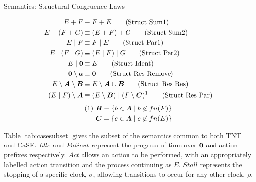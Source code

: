 \documentclass[orivec]{llncs}
\begin{document}
\begin{table}
  \caption{Semantics: Structural Congruence Laws}
 \label{tab:structcong}
 \vspace{-3mm}
  \shrule
  \begin{align}
   E + F & \equiv F + E \tag{Struct Sum1} \label{structsum1}
  \\
   E + (F + G) & \equiv (E + F) + G \tag{Struct Sum2} \label{structsum2}
   \\
    E \pc F & \equiv F \pc E \tag{Struct Par1} \label{structpar1}
  \\
   E \pc (F \pc G) & \equiv (E \pc F) \pc G \tag{Struct Par2} \label{structpar2}
 \\
    E \pc \nil & \equiv E \tag{Struct Ident} \label{structident}
   \\
    \nil \setminus \vec{a} & \equiv \nil \tag{Struct Res Remove}
   \label{structresremove}
   \\
    E \setminus \vec{A} \setminus \vec{B} & \equiv E \setminus \vec{A} \cup \vec{B}
   \tag{Struct Res Res} \label{structresres}
   \\
    (E \pc F) \setminus \vec{A} & \equiv (E \setminus \vec{B}) \pc (F
   \setminus \vec{C})^1 \tag{Struct Res Par} \label{structrespar}
\end{align}
\begin{align} 
   (1)\ & \vec{B} = \{b \in \vec{A} \pc b \not \in fn(F)\} \notag \\ 
   & \vec{C} = \{c \in \vec{A} \pc c \not \in fn(E)\} \notag
 \end{align} 
  \shrule
\end{table}

Table \ref{tab:casesubset} gives the subset of the semantics common to
both TNT and CaSE. $Idle$ and $Patient$ represent the progress of time
over $\textbf{0}$ and action prefixes respectively.  $Act$ allows an action to
be performed, with an appropriately labelled action transition and the
process continuing as $E$.  $Stall$ represents the stopping of a
specific clock, $\sigma$, allowing transitions to occur for any other
clock, $\rho$.
\end{document}
